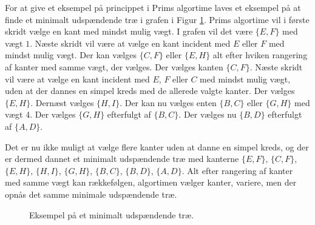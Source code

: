 \begin{exmp}
For at give et eksempel på princippet i Prims algortime laves et eksempel på at finde et minimalt udspændende træ i grafen i Figur \ref{eks_prim}. 
Prims algortime vil i første skridt vælge en kant med mindst mulig vægt. 
I grafen vil det være $\lbrace E,F \rbrace$ med vægt $1$. 
Næste skridt vil være at vælge en kant incident med $E$ eller $F$ med mindst mulig vægt. 
Der kan vælges $\lbrace C,F \rbrace$ eller $\lbrace E,H \rbrace$ alt efter hviken rangering af kanter med samme vægt, der vælges. 
Der vælges kanten $\lbrace C,F \rbrace$. 
Næste skridt vil være at vælge en kant incident med $E$, $F$ eller $C$ med mindst mulig vægt, uden at der dannes en simpel kreds med de allerede valgte kanter. 
Der vælges $\lbrace E,H \rbrace$. Dernæst vælges $\lbrace H,I \rbrace$. 
Der kan nu vælges enten $\lbrace B,C \rbrace$  eller $\lbrace G,H \rbrace$ med vægt 4. 
Der vælges $\lbrace G,H \rbrace$ efterfulgt af $\lbrace B,C \rbrace$. 
Der vælges nu $\lbrace B,D \rbrace$ efterfulgt af $\lbrace A,D \rbrace$.

Det er nu ikke muligt at vælge flere kanter uden at danne en simpel kreds, og der er dermed dannet et minimalt udspændende træ med kanterne $\lbrace E,F \rbrace$, $\lbrace C,F \rbrace$, $\lbrace E,H \rbrace$, $\lbrace H,I \rbrace$, $\lbrace G,H \rbrace$, $\lbrace B,C \rbrace$, $\lbrace B,D \rbrace$, $\lbrace A,D \rbrace$. 
Alt efter rangering af kanter med samme vægt kan rækkefølgen, algortimen vælger kanter, variere, men der opnås det samme minimale udspændende træ.
\end{exmp} 

\begin{figure}[!h]
  \centering
  \caption{Eksempel på et minimalt udspændende træ.}
  \label{eks_prim}
\end{figure}

